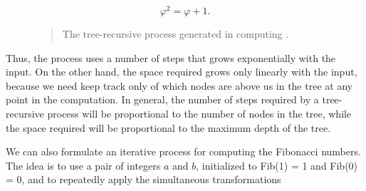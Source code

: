 $$\varphi^2 = \varphi + 1. $$


\begin{figure}[tb]
\label{Figure 1.5}
\centering
\begin{comment}
\heading{Figure 1.5:} The tree-recursive process generated in computing \code{(fib 5)}.

\begin{example}

                   ..<............ fib5   <..........
                ...     ___________/  \___________   .
             ...       /       . .....            \    .
           ..       fib4     .        . . . .     fib3  .
         ..     ____/. \____  ..             .  __/  \__  .
       ..      /  . .  ..   \    .        ..   /  . .   \   .
     ..     fib3 .       .  fib2 .        . fib2 .   .  fib1 .
   ..      / . \  .     .   /  \  .      .  /  \ ...  .  |  .
 ..       / . . \   .  .   /  . \   .  .   / .  \   .  . 1 .
.      fib2 . . fib1.  .fib1 .  fib0 . .fib1. . fib0 .  .  .
.      /  \  . . |  .  . |  .  . |   . . |   . . |   .   .>
V     /  . \   . 1  .  . 1  .  . 0  .  . 1  .  . 0  ..
.  fib1 .. fib0..  .   .   .   .   .   V   .   ..  .
.   |  .  . |  . .>     .>.     . .    ..>.      .>
.   1 .   . 0  .
 .   .     .  .
  .>.       ..

\end{example}
\end{comment}

\begin{quote}
 The tree-recursive process generated in computing .
\end{quote}
\end{figure}

\noindent
Thus, the process uses a number of steps that grows exponentially with the
input.  On the other hand, the space required grows only linearly with the
input, because we need keep track only of which nodes are above us in the tree
at any point in the computation.  In general, the number of steps required by a
tree-recursive process will be proportional to the number of nodes in the tree,
while the space required will be proportional to the maximum depth of the tree.

We can also formulate an iterative process for computing the Fibonacci numbers.
The idea is to use a pair of integers \( a \) and \( b \), initialized to
Fib(1) = 1 and Fib(0) = 0, and to repeatedly apply the
simultaneous transformations
\begin{comment}

\begin{example}
a <- a + b
b <- a
\end{example}

\end{comment}

